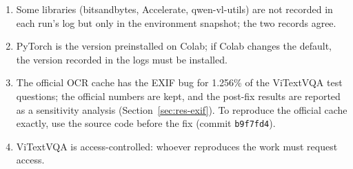 \begin{enumerate}
  \item Some libraries (bitsandbytes, Accelerate, qwen-vl-utils) are not recorded in each run's
  log but only in the environment snapshot; the two records agree.
  \item PyTorch is the version preinstalled on Colab; if Colab changes the default, the version
  recorded in the logs must be installed.
  \item The official OCR cache has the EXIF bug for 1.256\% of the ViTextVQA test questions; the
  official numbers are kept, and the post-fix results are reported as a sensitivity analysis
  (Section~\ref{sec:res-exif}). To reproduce the official cache exactly, use the source code
  before the fix (commit \texttt{b9f7fd4}).
  \item ViTextVQA is access-controlled: whoever reproduces the work must request access.
\end{enumerate}
